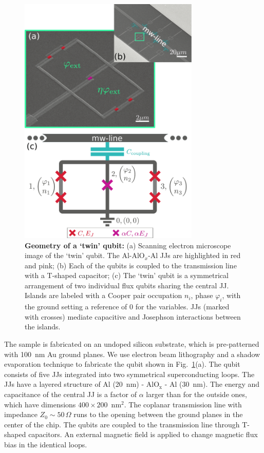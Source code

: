 \documentclass[%
reprint,
superscriptaddress,
bibnotes,
amsmath,
amssymb,
aps,
showkeys,
prb,
]{revtex4-1}
\begin{document}
\begin{figure}[htp]
\centering
  \includegraphics[width=8.6cm]{fig1}
  \caption{\small  \textbf{Geometry  of a  `twin'  qubit:}  (a) Scanning  electron
    microscope image of the `twin' qubit. The Al-AlO$_x$-Al JJs are highlighted in
    red and  pink; (b) Each  of the qubits is  coupled to the  transmission line
    with a T-shaped  capacitor; (c) The `twin' qubit is  a symmetrical arrangement
    of two individual  flux qubits \cite{Orlando_1999} sharing
    the central  JJ.  Islands are labeled  with a Cooper pair  occupation $n_i$,
    phase $\varphi_i$, with the  ground setting a reference of 0 for
    the variables.   JJs  (marked with  crosses)  mediate capacitive  and
    Josephson  interactions between  the islands.
  }
  \label{fig:setup}
\end{figure}

The sample is fabricated on an undoped silicon substrate, which is
pre-patterned with 100~nm Au ground planes. We  use electron beam lithography
and a shadow evaporation  technique to fabricate the qubit shown in
Fig.~\ref{fig:setup}(a). The qubit consists of five JJs integrated into two
symmetrical  superconducting  loops. The  JJs  have  a   layered  structure  of
Al (20~nm) - AlO$_{\text{x}}$ - Al (30~nm).  The energy  and  capacitance of  the
central JJ  is a  factor of  $\alpha$ larger than  for the  outside ones,  which have
dimensions $400\times200$~nm$^2$.    The  coplanar  transmission   line  with
impedance $ Z_{0} \sim 50\,\Omega $ runs to the opening between the ground planes in the
center of the chip. The qubits are coupled to the transmission line
through T-shaped  capacitors.  An external magnetic field is applied to change magnetic flux bias in the identical loops.
\end{document}
